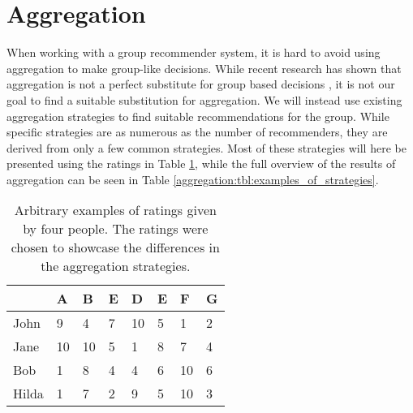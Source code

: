 \section{Aggregation} \label{bg:aggregation}
When working with a group recommender system, it is hard to avoid using aggregation to make group-like decisions. While recent research has shown that aggregation is not a perfect substitute for group based decisions , it is not our goal to find a suitable substitution for aggregation. We will instead use existing aggregation strategies to find suitable recommendations for the group. While specific strategies are as numerous as the number of recommenders, they are derived from only a few common strategies. Most of these strategies will here be presented using the ratings in Table \ref{aggregation:tbl:table_of_ratings}, while the full overview of the results of aggregation can be seen in Table \ref{aggregation:tbl:examples_of_strategies}.


\begin{table}[H]
	\centering
	\begin{tabular}{ | p{2cm} | p{1cm} | p{1cm} | p{1cm} | p{1cm} | p{1cm} | p{1cm} | p{1cm} | } \hline
		 & \textbf{A} & \textbf{B} & \textbf{E} & \textbf{D} & \textbf{E} & \textbf{F} & \textbf{G}  \\ \hline
		John & 9 & 4 & 7 & 10 & 5 & 1 & 2 \\ \hline
		Jane & 10 & 10 & 5 & 1 & 8 & 7 & 4 \\ \hline
		Bob & 1 & 8 & 4 & 4 & 6 & 10 & 6 \\ \hline
		Hilda & 1 & 7 & 2 & 9 & 5 & 10 & 3 \\ \hline
	\end{tabular}
	\caption{Arbitrary examples of ratings given by four people. The ratings were chosen to showcase the differences in the aggregation strategies.}
	\label{aggregation:tbl:table_of_ratings}
\end{table}


